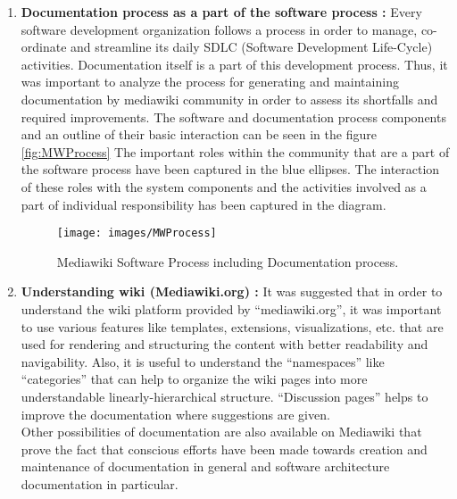 \begin{enumerate}
\item \textbf{Documentation process as a part of the software process : } Every software development organization follows a process in order to manage, co-ordinate and streamline its daily SDLC (Software Development Life-Cycle) activities. Documentation itself is a part of this development process. Thus, it was important to analyze the process for generating and maintaining documentation by mediawiki community in order to assess its shortfalls and required improvements.
\indent The software and documentation process components and an outline of their basic interaction can be seen in the figure \autoref{fig:MWProcess}  The important roles within the community that are a part of the software process have been captured in the blue ellipses. The interaction of these roles with the system components and the activities involved as a part of individual responsibility has been captured in the diagram. 
\vspace{10mm}
\begin{figure}[H]
  \centering
  \texttt{[image: images/MWProcess]}
  \caption[Mediawiki Software Process including Documentation process]{Mediawiki Software Process including Documentation process.}\label{fig:MWProcess}
\end{figure}

\item \textbf{Understanding wiki (Mediawiki.org) : }It was suggested that in order to understand the wiki platform provided by \enquote{mediawiki.org}, it was important to use various features like templates, extensions, visualizations, etc. that are used for rendering and structuring the content with better readability and navigability. Also, it is useful to understand the \enquote{namespaces} like \enquote{categories} that can help to organize the wiki pages into more understandable linearly-hierarchical structure. \enquote{Discussion pages} helps to improve the documentation where suggestions are given.
\\\indent Other possibilities of documentation are also available on Mediawiki that prove the fact that conscious efforts have been made towards creation and maintenance of documentation in general and software architecture documentation in particular. 

\begin{itemize}


\end{itemize}
\end{enumerate}
